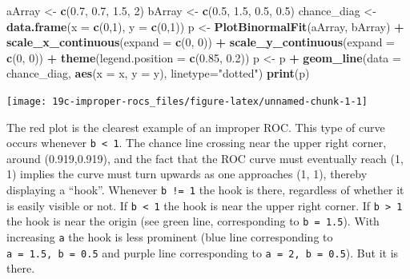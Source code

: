 \documentclass[
]{book}
\newenvironment{Shaded}{\begin{snugshade}}{\end{snugshade}}
\newcommand{\DataTypeTok}[1]{\textcolor[rgb]{0.13,0.29,0.53}{#1}}
\newcommand{\DecValTok}[1]{\textcolor[rgb]{0.00,0.00,0.81}{#1}}
\newcommand{\FloatTok}[1]{\textcolor[rgb]{0.00,0.00,0.81}{#1}}
\newcommand{\KeywordTok}[1]{\textcolor[rgb]{0.13,0.29,0.53}{\textbf{#1}}}
\newcommand{\NormalTok}[1]{#1}
\newcommand{\OperatorTok}[1]{\textcolor[rgb]{0.81,0.36,0.00}{\textbf{#1}}}
\newcommand{\StringTok}[1]{\textcolor[rgb]{0.31,0.60,0.02}{#1}}
\begin{document}
\begin{Shaded}
\begin{Highlighting}[]
\NormalTok{  aArray <-}\StringTok{ }\KeywordTok{c}\NormalTok{(}\FloatTok{0.7}\NormalTok{, }\FloatTok{0.7}\NormalTok{, }\FloatTok{1.5}\NormalTok{, }\DecValTok{2}\NormalTok{)}
\NormalTok{  bArray <-}\StringTok{ }\KeywordTok{c}\NormalTok{(}\FloatTok{0.5}\NormalTok{, }\FloatTok{1.5}\NormalTok{, }\FloatTok{0.5}\NormalTok{, }\FloatTok{0.5}\NormalTok{)}
\NormalTok{  chance_diag <-}\StringTok{ }\KeywordTok{data.frame}\NormalTok{(}\DataTypeTok{x =} \KeywordTok{c}\NormalTok{(}\DecValTok{0}\NormalTok{,}\DecValTok{1}\NormalTok{), }\DataTypeTok{y =} \KeywordTok{c}\NormalTok{(}\DecValTok{0}\NormalTok{,}\DecValTok{1}\NormalTok{))}
\NormalTok{  p <-}\StringTok{ }\KeywordTok{PlotBinormalFit}\NormalTok{(aArray, bArray) }\OperatorTok{+}
\StringTok{    }\KeywordTok{scale_x_continuous}\NormalTok{(}\DataTypeTok{expand =} \KeywordTok{c}\NormalTok{(}\DecValTok{0}\NormalTok{, }\DecValTok{0}\NormalTok{)) }\OperatorTok{+}\StringTok{ }
\StringTok{    }\KeywordTok{scale_y_continuous}\NormalTok{(}\DataTypeTok{expand =} \KeywordTok{c}\NormalTok{(}\DecValTok{0}\NormalTok{, }\DecValTok{0}\NormalTok{)) }\OperatorTok{+}
\StringTok{    }\KeywordTok{theme}\NormalTok{(}\DataTypeTok{legend.position =} \KeywordTok{c}\NormalTok{(}\FloatTok{0.85}\NormalTok{, }\FloatTok{0.2}\NormalTok{))}
\NormalTok{p <-}\StringTok{ }\NormalTok{p }\OperatorTok{+}\StringTok{ }\KeywordTok{geom_line}\NormalTok{(}\DataTypeTok{data =}\NormalTok{ chance_diag, }\KeywordTok{aes}\NormalTok{(}\DataTypeTok{x =}\NormalTok{ x, }\DataTypeTok{y =}\NormalTok{ y), }\DataTypeTok{linetype=}\StringTok{"dotted"}\NormalTok{)}
\KeywordTok{print}\NormalTok{(p)}
\end{Highlighting}
\end{Shaded}

\begin{center}\texttt{[image: 19c-improper-rocs\_files/figure-latex/unnamed-chunk-1-1]} \end{center}

The red plot is the clearest example of an improper ROC. This type of curve occurs whenever \texttt{b\ \textless{}\ 1}. The chance line crossing near the upper right corner, around (0.919,0.919), and the fact that the ROC curve must eventually reach (1, 1) implies the curve must turn upwards as one approaches (1, 1), thereby displaying a ``hook''. Whenever \texttt{b\ !=\ 1} the hook is there, regardless of whether it is easily visible or not. If \texttt{b\ \textless{}\ 1} the hook is near the upper right corner. If \texttt{b\ \textgreater{}\ 1} the hook is near the origin (see green line, corresponding to \texttt{b\ =\ 1.5}). With increasing \texttt{a} the hook is less prominent (blue line corresponding to \texttt{a\ =\ 1.5,\ b\ =\ 0.5} and purple line corresponding to \texttt{a\ =\ 2,\ b\ =\ 0.5}). But it is there.
\end{document}
